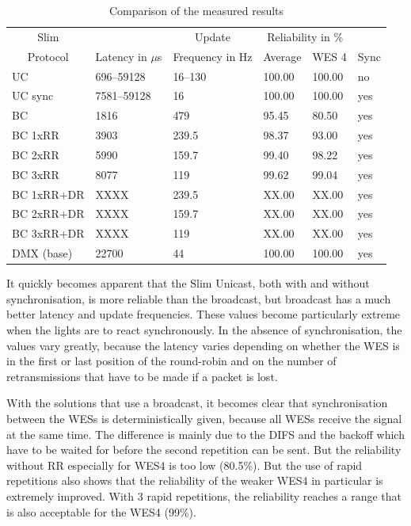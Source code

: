 \begin{table}[h]
	\centering
	\begin{tabular} { llllll }
	\toprule
	\multicolumn{1}{c}{Slim}
	& \multicolumn{1}{c}{}
	& \multicolumn{1}{c}{Update}
	& \multicolumn{2}{c}{Reliability in \%} 
	& \multicolumn{1}{c}{} \\

	\multicolumn{1}{c}{Protocol}
	& \multicolumn{1}{c}{Latency in $\mu$s}
	& \multicolumn{1}{c}{Frequency in Hz}
	& \multicolumn{1}{c}{Average}
	& \multicolumn{1}{c}{WES 4}
	& \multicolumn{1}{c}{Sync} \\

	\midrule
	UC        &  696–59128 & 16–130  & 100.00 & 100.00 & no \\
	UC sync   & 7581–59128 & 16      & 100.00 & 100.00 & yes \\
	BC        &  1816      & 479     & 95.45  & 80.50  & yes \\
	BC 1xRR   &  3903      & 239.5   & 98.37  & 93.00  & yes \\
	BC 2xRR   &  5990      & 159.7   & 99.40  & 98.22  & yes \\
	BC 3xRR   &  8077      & 119     & 99.62  & 99.04  & yes \\
	BC 1xRR+DR&  XXXX      & 239.5   & XX.00  & XX.00  & yes \\
	BC 2xRR+DR&  XXXX      & 159.7   & XX.00  & XX.00  & yes \\
	BC 3xRR+DR&  XXXX      & 119     & XX.00  & XX.00  & yes \\
	DMX (base)&  22700     & 44      & 100.00 & 100.00 & yes \\
	\bottomrule
	\end{tabular}
	\caption{Comparison of the measured results}
	\label{tab:results}
\end{table}

It quickly becomes apparent that the Slim Unicast, both with and without synchronisation, 
is more reliable than the broadcast, but broadcast has a much better latency and update frequencies.
These values become particularly extreme when the lights are to react synchronously.
In the absence of synchronisation, the values vary greatly, 
because the latency varies depending on whether the WES is in the first or last position of the round-robin
and on the number of retransmissions that have to be made if a packet is lost.

With the solutions that use a broadcast, 
it becomes clear that synchronisation between the WESs is deterministically given,
because all WESs receive the signal at the same time.
The difference is mainly due to the DIFS and the backoff 
which have to be waited for before the second repetition can be sent.
But the reliability without RR especially for WES4 is too low (80.5\%).
But the use of rapid repetitions also shows that the reliability of the weaker WES4 in particular is extremely improved.
With 3 rapid repetitions, the reliability reaches a range that is also acceptable for the WES4 (99\%).

